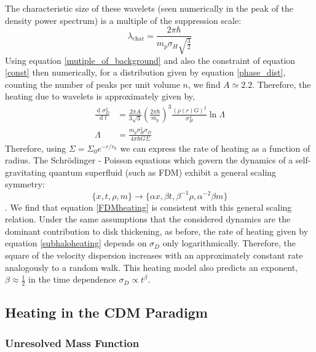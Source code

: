 \documentclass[usenatbib]{mnras}
\renewcommand{\d}[1]{\! \mathrm{d}#1 \:}
\newcommand{\deriv}[2]{\frac{\d{#1}}{\d{#2}}}
\renewcommand{\d}[1]{\ensuremath{\operatorname{d}\!{#1}}}
\begin{document}
The characteristic size of these wavelets (seen numerically in the peak of the density power spectrum) is a multiple of the suppression scale:
\begin{equation} \label{characteristic_wavelength}
\lambda_{\text{char}} = \frac{ 2 \pi \hbar}{m_p \sigma_H \sqrt{\frac{3}{2}}} 
\end{equation}
Using equation \eqref{mutiple_of_background}
and also the constraint of equation \eqref{const} then numerically, for a distribution given by equation \eqref{phase_dist}, counting the number of peaks per unit volume $n$, we find $A\simeq 2.2$.
Therefore, the heating due to wavelets is approximately given by,
\begin{subequations} \label{FDMheating}
\begin{align}
\deriv{\sigma_D^2}{t} & = \frac{2 \pi A}{3 \sqrt{3}} \left( \frac{2 \pi \hbar }{m_p} \right)^3 \frac{(\rho(r) G)^2}{\sigma_H^4} \ln{\Lambda}
\\
\Lambda & = \frac{m_p\sigma_H^2 \sigma_D}{4 \pi \hbar G \Sigma}
\end{align}
\end{subequations}
Therefore, using $\Sigma = \Sigma_0 e^{-r/r_0}$ we can express the rate of heating as a function of radius. The Schr\"{o}dinger - Poisson equations which govern the dynamics of a self-gravitating quantum superfluid (such as FDM) exhibit a general scaling symmetry:
\begin{equation}
\{ x, t , \rho, m \} \to \{\alpha x, \beta t, \beta^{-1} \rho, \alpha^{-2} \beta m \} 
\end{equation}
\noindent \citep{Schrodinger-Poisson}.
We find that equation \eqref{FDMheating} is consistent with this general scaling relation. Under the same assumptions that the considered dynamics are the dominant contribution to disk thickening, as before, the rate of heating given by equation \eqref{subhaloheating} depends on $\sigma_D$ only logarithmically. Therefore, the square of the velocity dispersion increases with an approximately constant rate analogously to a random walk. This heating model also predicts an exponent, $\beta \approx \tfrac{1}{2}$ in the time dependence $\sigma_D \propto t^{\beta}$.
\subsection{Heating in the CDM Paradigm}

\subsubsection{Unresolved Mass Function}
\end{document}
